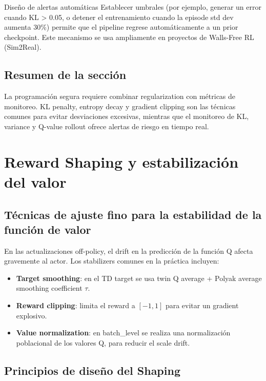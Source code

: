 \documentclass[a4paper]{article}
\begin{document}
\begin{knowledgebox}{Diseño de alertas automáticas}
Establecer umbrales (por ejemplo, generar un error cuando KL > 0.05, o detener el entrenamiento cuando la episode std dev aumenta 30\%) permite que el pipeline regrese automáticamente a un prior checkpoint. Este mecanismo se usa ampliamente en proyectos de Walls-Free RL (Sim2Real).
\end{knowledgebox}

\subsection{Resumen de la sección}

La programación segura requiere combinar regularization con métricas de monitoreo. KL penalty, entropy decay y gradient clipping son las técnicas comunes para evitar desviaciones excesivas, mientras que el monitoreo de KL, variance y Q-value rollout ofrece alertas de riesgo en tiempo real.

\section{Reward Shaping y estabilización del valor}

\subsection{Técnicas de ajuste fino para la estabilidad de la función de valor}

En las actualizaciones off-policy, el drift en la predicción de la función Q afecta gravemente al actor. Los stabilizers comunes en la práctica incluyen:

\begin{itemize}
    \item \textbf{Target smoothing}: en el TD target se usa twin Q average + Polyak average smoothing coefficient $\tau$.
    \item \textbf{Reward clipping}: limita el reward a $[-1,1]$ para evitar un gradient explosivo.
    \item \textbf{Value normalization}: en batch_level se realiza una normalización poblacional de los valores Q, para reducir el scale drift.
\end{itemize}

\subsection{Principios de diseño del Shaping}
\end{document}
